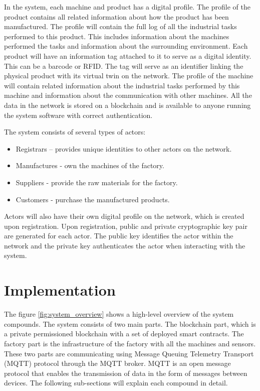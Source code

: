 \documentclass[runningheads]{llncs}
\begin{document}
\noindent In the system, each machine and product has a digital profile. The profile of the product contains all related information about how the product has been manufactured. The profile will contain the full log of all the industrial tasks performed to this product. This includes information about the machines performed the tasks and information about the surrounding environment. Each product will have an information tag attached to it to serve as a digital identity. This can be a barcode or RFID. The tag will serve as an identifier linking the physical product with its virtual twin on the network. The profile of the machine will contain related information about the industrial tasks performed by this machine and information about the communication with other machines. All the data in the network is stored on a blockchain and is available to anyone running the system software with correct authentication.

\bigbreak

\noindent The system consists of several types of actors:
\begin{itemize}
  \item Registrars – provides unique identities to other actors on the network.
  \item Manufactures - own the machines of the factory.
  \item Suppliers - provide the raw materials for the factory.
  \item Customers - purchase the manufactured products.
\end{itemize}

\noindent Actors will also have their own digital profile on the network, which is created upon registration. Upon registration,  public and private cryptographic key pair are generated for each actor. The public key identifies the actor within the network and the private key authenticates the actor when interacting with the system.

\section{Implementation}
The figure \ref{fig:system_overview} shows a high-level overview of the system compounds. The system consists of two main parts. The blockchain part, which is a private permissioned blockchain with a set of deployed smart contracts. The factory part is the infrastructure of the factory with all the machines and sensors. These two parts are communicating using Message Queuing Telemetry Transport (MQTT) protocol through the MQTT broker. MQTT is an open message protocol that enables the transmission of data in the form of messages between devices. The following sub-sections will explain each compound in detail.
\end{document}
